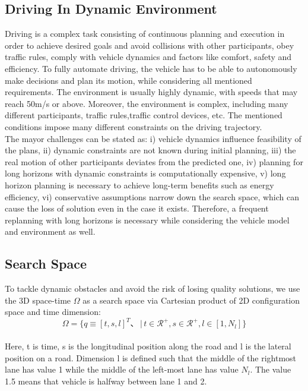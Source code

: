 \documentclass{thesisreport}
\begin{document}
 \subsection{Driving In Dynamic Environment}
 Driving is a complex task consisting of continuous planning and execution in order to achieve desired goals and avoid collisions with other participants, obey traffic rules, comply with vehicle dynamics and factors like comfort, safety and efficiency. To fully automate driving, the vehicle has to be able to autonomously make decisions and plan its motion, while considering all mentioned requirements. The environment is usually highly dynamic, with speeds that may reach 50m/s or above. Moreover, the environment is complex, including many different participants, traffic rules,traffic control devices, etc. The mentioned conditions impose many different constraints on the driving trajectory.\\
 \indent
 The mayor challenges can be stated as: i) vehicle dynamics influence feasibility of the plans, ii) dynamic constraints are not known during initial planning, iii) the real motion of other participants deviates from the predicted one, iv) planning for long horizons with dynamic constraints is computationally expensive, v) long horizon planning is necessary to achieve long-term benefits such as energy efficiency, vi) conservative assumptions narrow down the search space, which can cause the loss of solution even in the case it exists. Therefore, a frequent replanning with long horizons is necessary while considering the vehicle model and environment as well.
 \subsection{Search Space}
 To tackle dynamic obstacles and avoid the risk of losing quality solutions, we use the 3D space-time $\Omega$ as a search space via Cartesian product of 2D configuration space and time dimension:\\
 \begin{equation}\label{def:ratio}
 \Omega = \{q \equiv [t,s,l]^T 、\, |\, t\in \mathcal{R}^+, s\in \mathcal{R}^+ ,l \in[1,N_l]\}
 \end{equation}\\
 \indent
 Here, t is time, s is the longitudinal position along the road and l is the lateral position on a road. Dimension l is defined such that the middle of the rightmost lane has value 1 while the middle of the left-most lane has value $N_l$. The value 1.5 means that vehicle is halfway between lane 1 and 2.
\end{document}

